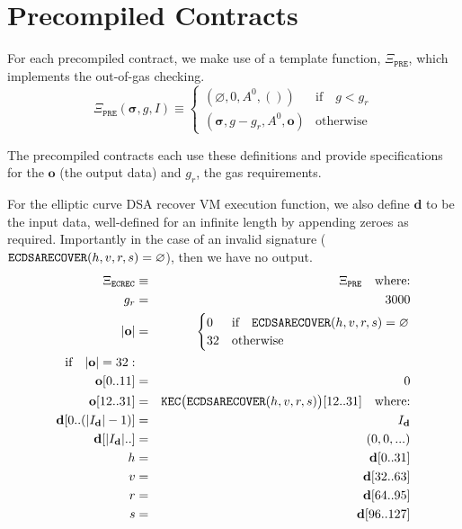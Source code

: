 \documentclass[9pt,oneside]{amsart}
\begin{document}
\section{Precompiled Contracts}\label{app:precompiled}

For each precompiled contract, we make use of a template function, $\Xi_{\mathtt{PRE}}$, which implements the out-of-gas checking.
\begin{equation}
\Xi_{\mathtt{PRE}}(\boldsymbol{\sigma}, g, I) \equiv \begin{cases}
(\varnothing, 0, A^0, ()) & \text{if} \quad g < g_r \\
(\boldsymbol\sigma, g - g_r, A^0, \mathbf{o}) & \text{otherwise}\end{cases}
\end{equation}

The precompiled contracts each use these definitions and provide specifications for the $\mathbf{o}$ (the output data) and $g_r$, the gas requirements.

For the elliptic curve DSA recover VM execution function, we also define $\mathbf{d}$ to be the input data, well-defined for an infinite length by appending zeroes as required. Importantly in the case of an invalid signature ($\mathtt{\tiny ECDSARECOVER}(h, v, r, s) = \varnothing$), then we have no output.
\begin{eqnarray}
\Xi_{\mathtt{ECREC}} &\equiv& \Xi_{\mathtt{PRE}} \quad \text{where:} \\
g_r &=& 3000\\
|\mathbf{o}| &=& \begin{cases} 0 & \text{if} \quad \mathtt{\tiny ECDSARECOVER}(h, v, r, s) = \varnothing\\ 32 & \text{otherwise} \end{cases}\\
\text{if} \quad |\mathbf{o}| = 32: &&\\
\mathbf{o}[0..11] &=& 0 \\
\mathbf{o}[12..31] &=& \mathtt{\tiny KEC}\big(\mathtt{\tiny ECDSARECOVER}(h, v, r, s)\big)[12..31] \quad \text{where:}\\
\mathbf{d}[0..(|I_\mathbf{d}|-1)] &=& I_\mathbf{d}\\
\mathbf{d}[|I_\mathbf{d}|..] &=& (0, 0, ...) \\
h &=& \mathbf{d}[0..31]\\
v &=& \mathbf{d}[32..63]\\
r &=& \mathbf{d}[64..95]\\
s &=& \mathbf{d}[96..127]
\end{eqnarray}
\end{document}

